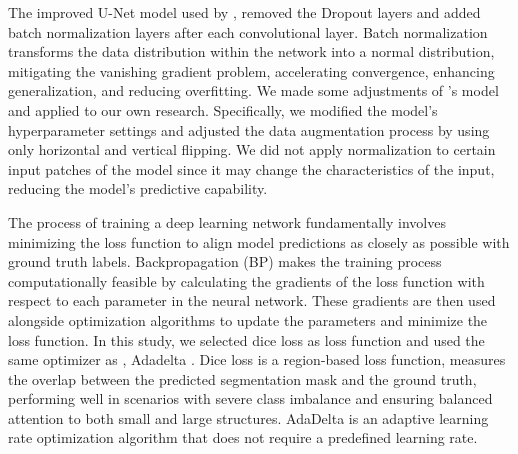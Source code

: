 \documentclass[preprint,12pt,authoryear]{elsarticle}
\begin{document}
The improved U-Net model used by \citet{pi_mapping_2022}, removed the Dropout layers and added batch normalization layers \citep{ioffe_batch_2015} after each convolutional layer. Batch normalization transforms the data distribution within the network into a normal distribution, mitigating the vanishing gradient problem, accelerating convergence, enhancing generalization, and reducing overfitting. We made some adjustments of \citet{pi_mapping_2022}'s model and applied to our own research. Specifically, we modified the model's hyperparameter settings and adjusted the data augmentation process by using only horizontal and vertical flipping. We did not apply normalization to certain input patches of the model since it may change the characteristics of the input, reducing the model's predictive capability.

The process of training a deep learning network fundamentally involves minimizing the loss function to align model predictions as closely as possible with ground truth labels. Backpropagation (BP) \citep{rumelhart_learning_1986} makes the training process computationally feasible by calculating the gradients of the loss function with respect to each parameter in the neural network. These gradients are then used alongside optimization algorithms to update the parameters and minimize the loss function. In this study, we selected dice loss \citep{sudre_generalised_2017} as loss function and used the same optimizer as \citet{pi_mapping_2022}, Adadelta \citep{zeiler_adadelta_2012}. Dice loss is a region-based loss function, measures the overlap between the predicted segmentation mask and the ground truth, performing well in scenarios with severe class imbalance and ensuring balanced attention to both small and large structures. AdaDelta is an adaptive learning rate optimization algorithm that does not require a predefined learning rate.
\end{document}
